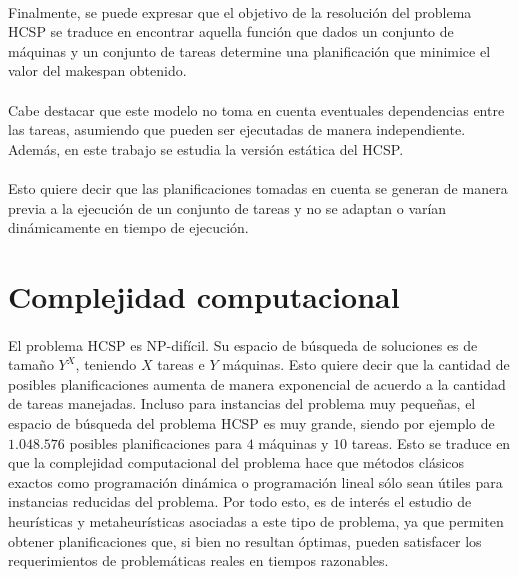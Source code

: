 \newpage %

\paragraph{}Finalmente, se puede expresar que el objetivo de la resolución del problema HCSP se traduce en encontrar aquella función que dados un conjunto de máquinas y un conjunto de tareas determine una planificación que minimice el valor del makespan obtenido.

\paragraph{}Cabe destacar que este modelo no toma en cuenta eventuales dependencias entre las tareas, asumiendo que pueden ser ejecutadas de manera independiente.
Además, en este trabajo se estudia la versión estática del HCSP.

\paragraph{} Esto quiere decir que las planificaciones tomadas en cuenta se generan de manera previa a la ejecución de un conjunto de tareas y no se adaptan o varían dinámicamente en tiempo de ejecución.

\section{Complejidad computacional} \label{section:descripcion-problema,subsection:complejidad-computacional}

\paragraph{}El problema HCSP es NP-difícil.
Su espacio de búsqueda de soluciones es de tamaño $Y^X$, teniendo $X$ tareas e $Y$ máquinas.
Esto quiere decir que la cantidad de posibles planificaciones aumenta de manera exponencial de acuerdo a la cantidad de tareas manejadas.
Incluso para instancias del problema muy pequeñas, el espacio de búsqueda del problema HCSP es muy grande, siendo por ejemplo de $1.048.576$ posibles planificaciones para $4$ máquinas y $10$ tareas.
Esto se traduce en que la complejidad computacional del problema hace que métodos clásicos exactos como programación dinámica o programación lineal sólo sean útiles para instancias reducidas del problema.
Por todo esto, es de interés el estudio de heurísticas y metaheurísticas asociadas a este tipo de problema, ya que permiten obtener planificaciones que, si bien no resultan óptimas, pueden satisfacer los requerimientos de problemáticas reales en tiempos razonables.

